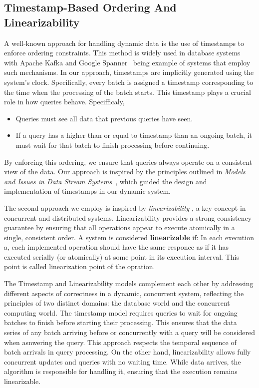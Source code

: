 \subsection{Timestamp-Based Ordering And Linearizability}  

A well-known approach for handling dynamic data is the use of timestamps to enforce ordering 
constraints. This method is widely used in database systems ~\cite{babcock2002} with 
Apache Kafka and Google Spanner~\cite{kafka2021,spanner2013} being example of systems
that employ such mechanisms.  
% 
In our approach, timestamps are implicitly generated using the system's clock. Specifically,
every batch is assigned a timestamp corresponding to the time when the processing of the batch
starts. This timestamp plays a crucial role in  how queries behave. Specifficaly,   

\begin{itemize} [noitemsep, topsep=3pt, partopsep=0pt, parsep=0pt]
    \item Queries must see all data that previous queries have seen.  
    \item If a query has a higher than or equal to timestamp than an ongoing batch, 
    it must wait for that batch to finish processing before continuing.  
\end{itemize}  
% 
By enforcing this ordering, we ensure that queries always operate on a consistent view of the data.
Our approach is inspired by the principles outlined in \textit{Models and Issues in Data Stream
Systems}~\cite{babcock2002}, which guided the design and implementation of timestamps in our dynamic system.  

The second approach we employ is inspired by \textit{linearizability}
\cite{herlihyWingLinearizability}, a key concept in concurrent
and distributed systems. Linearizability provides a strong consistency guarantee by ensuring
that all operations appear to execute atomically in a single, consistent order.  
% 
A system is considered \textbf{linearizable} if:  
 In each execution a, each implemented operation should have the same responce
 as if it has executed serially (or atomically) at some point in its execution
 interval. This point is called linearization point of the opration.

The Timestamp and Linearizability models complement each other by addressing different
aspects of correctness in a dynamic, concurrent system, reflecting the principles of two
distinct domains: the database world and the concurrent computing world.
The timestamp model requires queries to wait for ongoing batches to finish before starting
their processing. This ensures that the data series of any batch arriving before or concurrently 
with a query will be considered when asnwering the query.
This approach respects the temporal sequence of batch arrivals in query processing.
On the other hand, linearizability allows fully concurrent updates and queries with no 
waiting time. While data arrives, the algorithm is responsible for handling it, ensuring that the execution
remains linearizable.